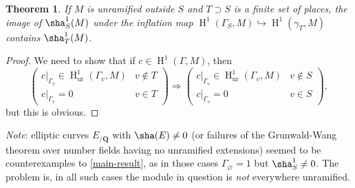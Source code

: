 \documentclass{article}
\DeclareMathOperator{\h}{H}
\newcommand{\dQ}{\mathbf{Q}}
\newcommand{\monic}{\hookrightarrow}
\newcommand{\unramified}{\mathrm{ur}}
\newtheorem{theorem}{Theorem}
\begin{document}
\begin{theorem}\label{main-result}
If $M$ is unramified outside $S$ and $T\supset S$ is a finite set of places, 
the image of $\sha_S^1(M)$ under the inflation map 
$\h^1(\Gamma_S,M)\monic \h^1(\gamma_T,M)$ contains $\sha_T^1(M)$. 
\end{theorem}
\begin{proof}
We need to show that if $c\in \h^1(\Gamma,M)$, then 
\[
    \left(
        \begin{array}{cc} 
            c|_{\Gamma_v} \in \h^1_\unramified(\Gamma_v,M) & v\notin T \\
            c|_{\Gamma_v}=0 & v\in T
        \end{array}
    \right) \Rightarrow
    \left(
        \begin{array}{cc} 
            c|_{\Gamma_v} \in \h^1_\unramified(\Gamma_v,M) & v\notin S \\
            c|_{\Gamma_v}=0 & v\in S
        \end{array}
    \right) ,
\]
but this is obvious.
\end{proof}

\emph{Note}: elliptic curves $E_{/\dQ}$ with $\sha(E)\ne 0$ (or failures of the 
Grunwald-Wang theorem over number fields having no unramified extensions) seemed to 
be counterexamples to \autoref{main-result}, as in those cases 
$\Gamma_\varnothing=1$ but $\sha^1_S\ne 0$. The problem is, in all such cases the 
module in question is \emph{not} everywhere unramified.





\printbibliography
\end{document}
